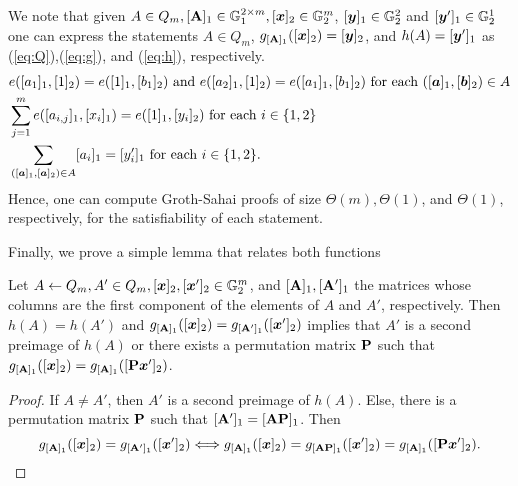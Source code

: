 We note that given $A\in Q_m,[\mathbf{{A}}]_1\in\mathbb{G}^{2\times m}_1,[{\boldsymbol{x}}]_2\in\mathbb{G}^m_2$, $[{\boldsymbol{y}}]_1\in\mathbb{G}_2^2$ and $[{\boldsymbol{y}}']_1\in\mathbb{G}^1_2$ one can express the statements $A\in Q_m$, $g_{[\mathbf{{A}}]_1}([{\boldsymbol{x}}]_2)=[{\boldsymbol{y}}]_2$, and $h(A)=[{\boldsymbol{y}}']_1$ as (\ref{eq:Q}),(\ref{eq:g}), and (\ref{eq:h}), respectively.
 \begin{align}
&e([a_{1}]_1,[1]_2) = e([1]_1,[{b}_1]_2)\text{ and }e([a_{2}]_1,[1]_2)=e([a_{1}]_1,[b_1]_2)
\text{ for each }([{\boldsymbol{a}}]_1,[{\boldsymbol{b}}]_2)\in A \label{eq:Q}\\
&\sum_{j=1}^m e([a_{i,j}]_1,[x_i]_1) = e([1]_1,[y_i]_2) \text{ for each } i\in\{1,2\} \label{eq:g}\\
&\sum_{([{\boldsymbol{a}}]_1,[{\boldsymbol{a}}]_2)\in A} [a_i]_1 = [y'_i]_1 \text{ for each } i\in\{1,2\}.\label{eq:h}
\end{align}
Hence, one can compute Groth-Sahai proofs of size $\Theta(m),\Theta(1)$, and $\Theta(1)$, respectively, for the satisfiability of each statement.

Finally, we prove a simple lemma that relates both functions
\begin{lemma}\label{lemma:hg}
Let $A\gets Q_m,A'\in Q_m,[{\boldsymbol{x}}]_2,[{\boldsymbol{x}}']_2\in\mathbb{G}^m_2$, and $[\mathbf{{A}}]_1,[\mathbf{{A}}']_1$ the matrices whose columns are the first component of the elements of $A$ and $A'$, respectively. Then $h(A)=h(A')$ and $g_{[\mathbf{{A}}]_1}([{\boldsymbol{x}}]_2)=g_{[\mathbf{{A}}']_1}([{\boldsymbol{x}}']_2)$ implies that $A'$ is a second preimage of $h(A)$ or there exists a permutation matrix $\mathbf{{P}}$ such that $g_{[\mathbf{{A}}]_1}([{\boldsymbol{x}}]_2)=g_{[\mathbf{{A}}]_1}([\mathbf{{P}}{\boldsymbol{x}}']_2)$.
\end{lemma}
\begin{proof}
If $A\neq A'$, then $A'$ is a second preimage of $h(A)$. Else, there is a permutation matrix $\mathbf{{P}}$ such that $[\mathbf{{A}}']_1 =[\mathbf{{A}}\mathbf{{P}}]_1$. Then
$$
 g_{[\mathbf{{A}}]_1}([{\boldsymbol{x}}]_2)=g_{[\mathbf{{A}}']_1}([{\boldsymbol{x}}']_2)\Longleftrightarrow  g_{[\mathbf{{A}}]_1}([{\boldsymbol{x}}]_2)=g_{[\mathbf{{A}}\mathbf{{P}}]_1}([{\boldsymbol{x}}']_2)=g_{[\mathbf{{A}}]_1}([\mathbf{{P}}{\boldsymbol{x}}']_2).
$$
\end{proof}